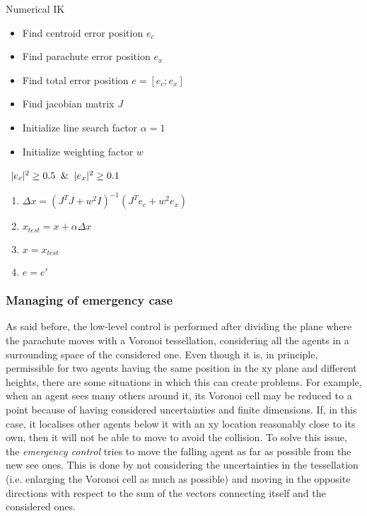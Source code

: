 \begin{algorithm}[hb]
 {\footnotesize
\caption{Numerical IK}\label{NIK}
    \begin{itemize}
    \item Find centroid error position $e_c$
    \item Find parachute error position $e_x$
    \item Find total error position $e=[e_c;e_x]$
    \item Find jacobian matrix $J$
    \item Initialize line search factor $\alpha=1$
    \item Initialize weighting factor $w$
    \end{itemize}
    \mywhile \ $|e_c|^2 \ge 0.5 \And |e_x|^2 \ge 0.1$
    \begin{enumerate}
        \item $\Delta x = (J^TJ+w^2I)^{-1}(J^Te_c+w^2e_x)$
        \item $x_{test} = x + \alpha \Delta x$
        \item $x = x_{test}$
        \item $e = e'$
    \end{enumerate}
    \myendwhile
    \label{algorithm}
    }
\end{algorithm}

\subsubsection{Managing of emergency case}
As said before, the low-level control is performed after dividing the plane where the parachute moves with a Voronoi tessellation, considering all the agents in a surrounding space of the considered one. Even though it is, in principle, permissible for two agents having the same position in the xy plane and different heights, there are some situations in which this can create problems. For example, when an agent sees many others around it, its Voronoi cell may be reduced to a point because of having considered uncertainties and finite dimensions. If, in this case, it localises other agents below it with an xy location reasonably close to its own, then it will not be able to move to avoid the collision. To solve this issue, the \textit{emergency control} tries to move the falling agent as far as possible from the new see ones. This is done by not considering the uncertainties in the tessellation (i.e. enlarging the Voronoi cell as much as possible) and moving in the opposite directions with respect to the sum of the vectors connecting itself and the considered ones.
